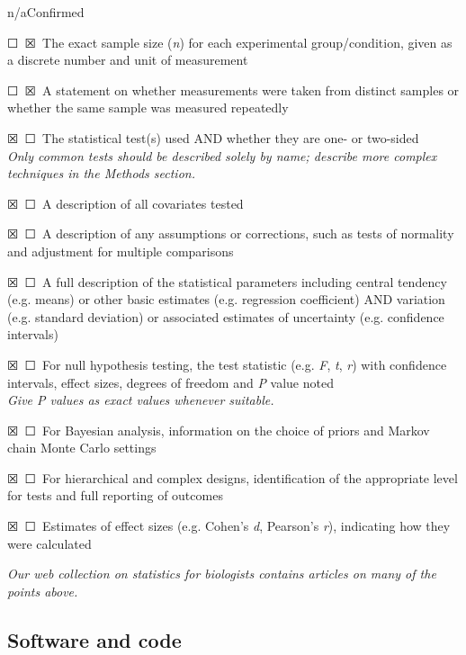 \documentclass{article}
\newcommand{\yes}{\textsf{☒}}
\newcommand{\no}{\textsf{☐}}
\begin{document}
\noindent n/a\quad Confirmed

\begin{hangpars}
\no\ \yes\ The exact sample size (\emph{n}) for each experimental group/condition, given as a discrete number and unit of measurement

\no\ \yes\ A statement on whether measurements were taken from distinct samples or whether the same sample was measured repeatedly

\yes\ \no\ The statistical test(s) used AND whether they are one- or two-sided\\
\emph{Only common tests should be described solely by name; describe more complex techniques in the Methods section.}

\yes\ \no\ A description of all covariates tested

\yes\ \no\ A description of any assumptions or corrections, such as tests of normality and adjustment for multiple comparisons

\yes\ \no\ A full description of the statistical parameters including central tendency (e.g. means) or other basic estimates (e.g. regression coefficient) AND variation (e.g. standard deviation) or associated estimates of uncertainty (e.g. confidence intervals)

\yes\ \no\ For null hypothesis testing, the test statistic (e.g. \emph{F}, \emph{t}, \emph{r}) with confidence intervals, effect sizes, degrees of freedom and \emph{P} value noted\\
\emph{Give P values as exact values whenever suitable.}

\yes\ \no\ For Bayesian analysis, information on the choice of priors and Markov chain Monte Carlo settings

\yes\ \no\ For hierarchical and complex designs, identification of the appropriate level for tests and full reporting of outcomes

\yes\ \no\ Estimates of effect sizes (e.g. Cohen's \emph{d}, Pearson's \emph{r}), indicating how they were calculated
\end{hangpars}

\begin{center}\small\emph{Our web collection on statistics for biologists contains articles on many of the points above.}\end{center}

\subsection*{Software and code}
\end{document}
